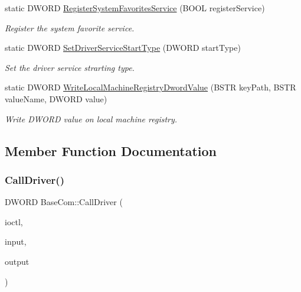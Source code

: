 \begin{DoxyCompactItemize}
\item 
static D\+W\+O\+RD \hyperlink{class_base_com_aa5bd0c7ed2b559f9be436622febb3dfb}{Register\+System\+Favorites\+Service} (B\+O\+OL register\+Service)
\begin{DoxyCompactList}\small\item\em Register the system favorite service. \end{DoxyCompactList}\item 
static D\+W\+O\+RD \hyperlink{class_base_com_a4c4f6cb8a6560a8a44fa7053d1747ea7}{Set\+Driver\+Service\+Start\+Type} (D\+W\+O\+RD start\+Type)
\begin{DoxyCompactList}\small\item\em Set the driver service strarting type. \end{DoxyCompactList}\item 
static D\+W\+O\+RD \hyperlink{class_base_com_ae0f1340ab68f4c9bb0369afb6bbafa00}{Write\+Local\+Machine\+Registry\+Dword\+Value} (B\+S\+TR key\+Path, B\+S\+TR value\+Name, D\+W\+O\+RD value)
\begin{DoxyCompactList}\small\item\em Write D\+W\+O\+RD value on local machine registry. \end{DoxyCompactList}\end{DoxyCompactItemize}


\subsection{Member Function Documentation}
\mbox{\label{class_base_com_a975a72a5b377ede1d3106189b25f858b}} 
\subsubsection{\texorpdfstring{Call\+Driver()}{CallDriver()}}
{\footnotesize\ttfamily D\+W\+O\+RD Base\+Com\+::\+Call\+Driver (\begin{DoxyParamCaption}\item[{D\+W\+O\+RD}]{ioctl,  }\item[{B\+S\+TR}]{input,  }\item[{B\+S\+TR $\ast$}]{output }\end{DoxyParamCaption})\hspace{0.3cm}{\ttfamily [static]}}


